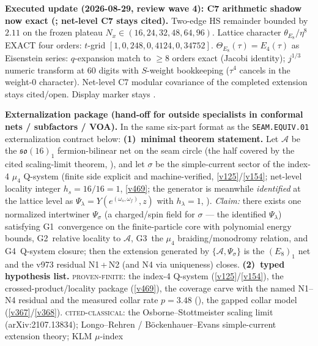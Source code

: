 \par\smallskip\noindent\textbf{Executed update (2026-08-29, review wave 4): C7 arithmetic shadow
now exact
(; net-level C7 stays
cited).}
Two-edge HS remainder bounded by $2.11$ on the frozen plateau $N_x\in(16,24,32,48,64,96)$.
Lattice character $\theta_{E_8}/\eta^8$ EXACT four orders: $t$-grid
$[1,0,248,0,4124,0,34752]$.  $\Theta_{E_8}(\tau)=E_4(\tau)$ as Eisenstein series: $q$-expansion
match to $\ge8$ orders exact (Jacobi identity); $j^{1/3}$ numeric transform at $60$ digits with
$S$-weight bookkeeping ($\tau^4$ cancels in the weight-$0$ character).  Net-level C7 modular
covariance of the completed extension stays cited/open.  Display marker stays \mO.

\par\smallskip\noindent\textbf{Externalization package (hand-off for outside specialists in
conformal nets / subfactors / VOA).}  In the same six-part format as the \texttt{SEAM.EQUIV.01}
externalization contract below:
\textbf{(1)~minimal theorem statement.}  Let $\mathcal A$ be the $\mathfrak{so}(16)_1$
fermion-bilinear net on the seam circle (the half covered by the cited scaling-limit theorem,
), and let $\sigma$ be the simple-current sector of the
index-4 $\mu_4$ Q-system (finite side explicit and machine-verified, \vref{v125}/\vref{v154};
net-level locality integer $h_s = 16/16 = 1$, \vref{v469}; the generator is meanwhile
\emph{identified} at the lattice level as $\Psi_\lambda = Y(e^{(\omega_s,\omega_f)},z)$ with
$h_\lambda = 1$, ).  \emph{Claim:} there exists one
normalized intertwiner $\Psi_\sigma$ (a charged/spin field for $\sigma$ --- the identified
$\Psi_\lambda$) satisfying
G1~convergence on the finite-particle core with polynomial energy bounds, G2~relative locality
to $\mathcal A$, G3~the $\mu_4$ braiding/monodromy relation, and G4~Q-system closure; then the
extension generated by $\{\mathcal A, \Psi_\sigma\}$ is the $(E_8)_1$ net and the v973
residual N1\,+\,N2 (and N4 via uniqueness) closes.
\textbf{(2)~typed hypothesis list.}  \textsc{proven-finite}: the index-4 Q-system
(\vref{v125}/\vref{v154}), the crossed-product/locality package (\vref{v469}), the coverage
carve with the named N1--N4 residual and the measured collar rate $p = 3.48$
(), the gapped collar model (\vref{v367}/\vref{v368}).
\textsc{cited-classical}: the Osborne--Stottmeister scaling limit (arXiv:2107.13834);
Longo--Rehren / B\"ockenhauer--Evans simple-current extension theory; KLM $\mu$-index

